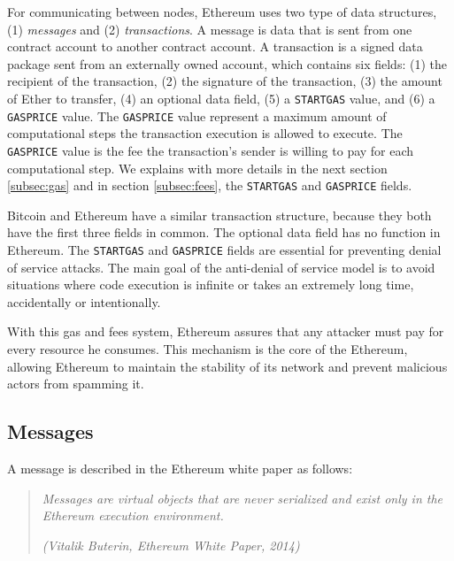 For communicating between nodes, Ethereum uses two type of data structures, (1) \textit{messages} and (2) \textit{transactions}. A message is data that is sent from one contract
account to another contract account. A transaction is a signed data package sent from an externally owned account, which contains six fields: (1) the recipient of the transaction, (2) the signature of the transaction, (3) the amount of Ether to transfer,
(4) an optional data field, (5) a \texttt{STARTGAS} value, and (6) a \texttt{GASPRICE} value. The \texttt{GASPRICE} value represent a maximum amount of computational steps the transaction execution is allowed to execute.
The \texttt{GASPRICE} value is the fee the transaction's sender 
is willing to pay for each computational step. We explains with more details in the next section \ref{subsec:gas} and in section \ref{subsec:fees}, 
the \texttt{STARTGAS} and \texttt{GASPRICE} fields. 

Bitcoin and Ethereum have a similar transaction structure, because they both have the first three fields in common. The optional data field has no function in Ethereum. The \texttt{STARTGAS} and \texttt{GASPRICE} fields are
essential for preventing denial of service attacks. The main goal of
the anti-denial of service model is to avoid situations where code execution is infinite or takes an extremely long time, accidentally
or intentionally.

With this gas and fees system, Ethereum assures that any attacker must pay for every resource he consumes. This mechanism is the core of the Ethereum,
allowing Ethereum to maintain the stability of its network and prevent malicious actors from spamming it.


\subsection{Messages}

A message is described in the Ethereum white paper \cite{ethereum_white_paper} as follows:


\begin{quote}
   \textit{Messages are virtual objects that are never serialized and exist only in the Ethereum execution environment.}

   \textit{(Vitalik Buterin, Ethereum White Paper, 2014)}
\end{quote}


